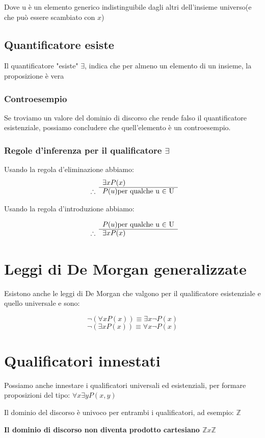 \documentclass[a4paper]{article}
\begin{document}
Dove u è un elemento generico indistinguibile dagli altri dell'insieme universo(e che può essere scambiato con $ x $)

\subsection{Quantificatore esiste}

Il quantificatore "esiste" $ \exists $, indica che per almeno un elemento di un insieme, la proposizione è vera

\subsubsection{Controesempio}

Se troviamo un valore del dominio di discorso che rende falso il quantificatore esistenziale, possiamo concludere che quell'elemento è un controesempio.

\subsubsection{Regole d'inferenza per il qualificatore $ \exists $ }

Usando la regola d'eliminazione abbiamo:
\[
\begin{array}{ r l }
	& \exists xP(x) \\
	\cline{2-2}
	\therefore & P(u) \text{per qualche u $ \in $ U}
\end{array}
\]

Usando la regola d'introduzione abbiamo:

\[
\begin{array}{ r l }
	& P(u) \text{per qualche u $ \in $ U} \\
	\cline{2-2}
	\therefore & \exists xP(x)
\end{array}
\]

\section{Leggi di De Morgan generalizzate}

Esistono anche le leggi di De Morgan che valgono per il qualificatore esistenziale e quello universale e sono:

$$ \neg(\forall x P(x)) \equiv \exists x \neg P(x) $$
$$ \neg(\exists x P(x)) \equiv \forall x \neg P(x) $$

\section{Qualificatori innestati}

Possiamo anche innestare i qualificatori universali ed esistenziali, per formare proposizioni del tipo: $ \forall x \exists y P(x,y) $

Il dominio del discorso è univoco per entrambi i qualificatori, ad esempio: $ \mathbb{Z} $ 

\textbf{Il dominio di discorso non diventa prodotto cartesiano $\mathbb{Z} x \mathbb{Z}$}
\end{document}
